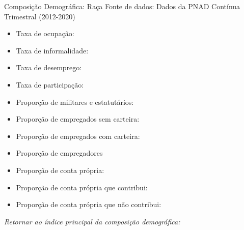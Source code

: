 \begin{frame}[label=_composicao_demografica_raca]{Composição Demográfica: Raça}
{\footnotesize Fonte de dados: Dados da PNAD Contínua Trimestral (2012-2020)}
\begin{itemize}
\item{Taxa de ocupação: \hyperlink{_composicao_demografica_raca_taxa_de_ocupacao}{}}
\item{Taxa de informalidade: \hyperlink{_composicao_demografica_raca_taxa_de_informalidade}{}}
\item{Taxa de desemprego: \hyperlink{_composicao_demografica_raca_taxa_de_desemprego}{}}
\item{Taxa de participação: \hyperlink{_composicao_demografica_raca_taxa_de_participacao}{}}
\item{Proporção de militares e estatutários: \hyperlink{_composicao_demografica_raca_prop_militar}{}}
\item{Proporção de empregados sem carteira: \hyperlink{_composicao_demografica_raca_prop_empregadoSC}{}}
\item{Proporção de empregados com carteira: \hyperlink{_composicao_demografica_raca_prop_empregadoCC}{}}
\item{Proporção de empregadores \hyperlink{_composicao_demografica_raca_prop_empregador}{}}
\item{Proporção de conta própria: \hyperlink{_composicao_demografica_raca_prop_cpropria}{}}
\item{Proporção de conta própria que contribui: \hyperlink{_composicao_demografica_raca_prop_cpropriaC}{}}
\item{Proporção de conta própria que não contribui: \hyperlink{_composicao_demografica_raca_prop_cpropriaNc}{}}
\end{itemize}

\begin{small}
\textit{Retornar ao índice principal da composição demográfica: \hyperlink{_composicao_demografica}{} }
\end{small}

\end{frame}

